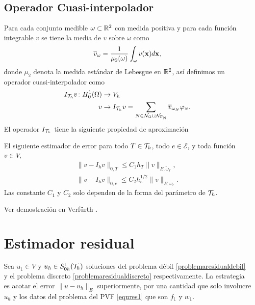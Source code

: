 \subsection{Operador Cuasi-interpolador}
Para cada conjunto medible $\omega\subset {\ensuremath{\mathbb{R}}}^{2}$ con medida positiva y para cada funci\'on integrable $v$ se tiene la media de $v$ sobre $\omega$ como 
\[ \overline{v}_{\omega} = \frac{1}{\mu_{2}(\omega)}\int_{\omega} v({\bf x}) d{\bf x}, \]
donde $\mu_{2}$ denota la medida est\'andar de Lebesgue en ${\mathbb{R}}^{2}$, as\'i definimos un operador cuasi-interpolador como 
\begin{equation}\label{cuasiinterpolador}
\begin{split}
I_{{\mathcal{T}}_{h}}v\colon H^{1}_{0}(\Omega)& \to V_{h} \\
        v& \to I_{{\mathcal{T}}_{h}}v=\sum_{N\in \mathcal{N}_{\Omega}\cup \mathcal{N}_{\Gamma_{\text{\tiny N}}}} \overline{v}_{\omega_{\text{\tiny $N$}}} \varphi_{\text{\tiny $N$}}. 
\end{split}
\end{equation}
El operador $I_{{\mathcal{T}}_{h}}$ tiene la siguiente propiedad de aproximaci\'on
\begin{proposicion}\label{clementinter}
El siguiente estimador de error para todo $T\in {\ensuremath{\mathcal{T}}}_{h}$, todo $e\in \mathcal{E}$, y toda funci\'on $v\in V$, 
\begin{align*}
\| v -I_{h}v \|_{0,T}\leq C_{1}h_{T}\| v\|_{E,\widetilde{\omega}_{T}},\\
\| v -I_{h}v \|_{0,e}\leq C_{2}h^{1/2}_{e}\| v\|_{E,\widetilde{\omega}_{e}}.
\end{align*}
Las constante  $C_{1}$ y $C_{2}$ solo dependen de la forma del par\'ametro de ${\mathcal{T}}_{h}$. 
\end{proposicion}
Ver demostraci\'on en Verf\"urth \cite[pag 108]{Rudiger2013}.
\section{Estimador residual}
Sea $u_{1}\in V$ y $u_{h}\in S^{1}_{0h}({\mathcal{T}}_{h})$ soluciones del problema d\'ebil \eqref{problemaresidualdebil} y el problema discreto \eqref{problemaresidualdiscreto} respectivamente. La estrategia es acotar el error $\| u-u_{h} \|_{E}$ superiormente, por una cantidad que solo involucre $u_{h}$ y los datos del problema del PVF \eqref{equres1} que son $f_{1}$ y $w_{1}$.

